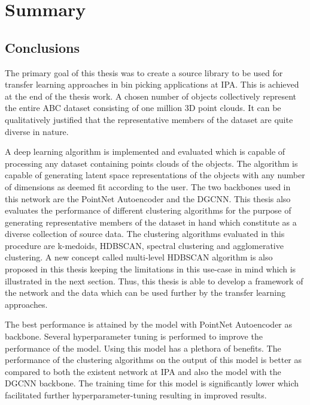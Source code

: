 \section{Summary}
\subsection{Conclusions}
The primary goal of this thesis was to create a source library to be used for transfer learning approaches in bin picking applications at \ac{IPA}. This is achieved at the end of the thesis work. A chosen number of objects collectively represent the entire ABC dataset \cite{Koch_2019_CVPR} consisting of one million 3D point clouds. It can be qualitatively justified that the representative members of the dataset are quite diverse in nature.

\vspace{5mm}

A deep learning algorithm is implemented and evaluated which is capable of processing any dataset containing points clouds of the objects. The algorithm is capable of generating latent space representations of the objects with any number of dimensions as deemed fit according to the user. The two backbones used in this network are the PointNet Autoencoder and the \ac{DGCNN}. This thesis also evaluates the performance of different clustering algorithms for the purpose of generating representative members of the dataset in hand which constitute as a diverse collection of source data. The clustering algorithms evaluated in this procedure are k-medoids, \ac{HDBSCAN}, spectral clustering and agglomerative clustering. A new concept called multi-level \ac{HDBSCAN} algorithm is also proposed in this thesis keeping the limitations in this use-case in mind which is illustrated in the next section.  Thus, this thesis is able to develop a framework of the network and the data which can be used further by the transfer learning approaches. 

\vspace{5mm}

The best performance is attained by the model with PointNet Autoencoder as backbone. Several hyperparameter tuning is performed to improve the performance of the model. Using this model has a plethora of benefits. The performance of the clustering algorithms on the output of this model is better as compared to both the existent network at \ac{IPA} and also the model with the \ac{DGCNN} backbone. The training time for this model is significantly lower which facilitated further hyperparameter-tuning resulting in improved results. 

